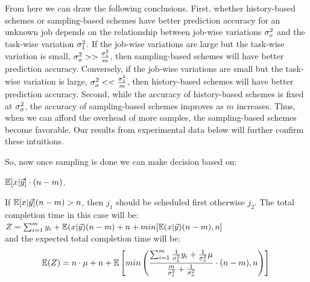 From here we can draw the following conclusions. First, whether history-based
schemes or sampling-based schemes have better prediction accuracy for an unknown
job depends on the relationship between job-wise variations $\sigma_o^2$ and
the task-wise variation $\sigma_1^2$. If the job-wise variations are large
but the task-wise variation is small, \ie $\sigma_o^2 >>
\frac{\sigma_1^2}{m}$, then sampling-based schemes will have better
prediction accuracy. Conversely, if the job-wise variations are small but
the task-wise variation is large, \ie $\sigma_o^2 <<
\frac{\sigma_1^2}{m}$, then  history-based schemes will have better
prediction accuracy. Second, while the accuracy of history-based schemes is
fixed at $\sigma_o^2$, the accuracy of sampling-based schemes improves as $m$
increases. Thus, when we can afford the overhead of more samples, the
sampling-based schemes become favorable. Our results from experimental
data below will further confirm these intuitions.


So, now once sampling is done we can make decision based on:\\
\begin{center}
\xspace $\mathbb{E}[x|\vec{y}] \cdot (n-m)$. 
\end{center}
If $\mathbb{E}[x|\vec{y}](n-m) > n$, then $j_1$ should be scheduled first otherwise $j_2$.
The total completion time in this case will be:\\
$Z = \sum_{i=1}^{m} y_{i} + \mathbb{E}(x|\vec{y})(n-m) + n + min[\mathbb{E}(x|\vec{y})(n-m), n]$\\
and the expected total completion time will be:\\
\begin{equation}
\label{equation:samplingExpectation}
\mathbb{E}(Z) = n\cdot\mu + n + \mathbb{E}\left[ min\left(\frac{{\sum_{i=1}^{m}\frac{1}{\sigma_1^2}y_{i} + \frac{1}{\sigma_o^2}\mu}}{\frac{m}{\sigma_1^2} + \frac{1}{\sigma_o^2}}\cdot(n-m),n\right)\right]\\
\end{equation}
\fi

